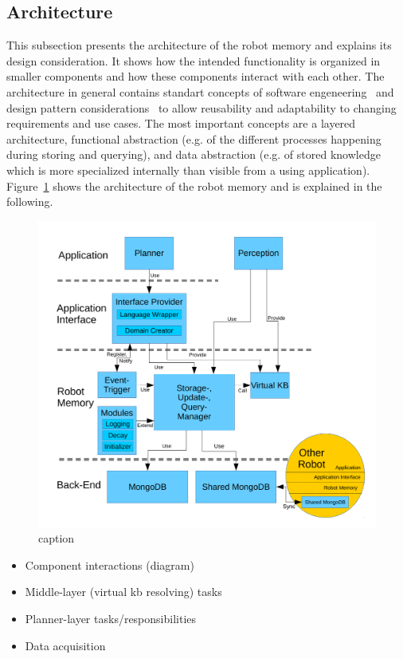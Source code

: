 \documentclass[a4paper,11pt]{article}
\newcommand{\reffig}[1]{Figure~\ref{#1}}
\begin{document}
\subsection{Architecture}
\label{sec:arch}
This subsection presents the architecture of the robot memory and
explains its design consideration. It shows how the intended
functionality is organized in smaller components and how these
components interact with each other.  The architecture in general
contains standart concepts of software
engeneering~\cite{software-architecture} and design pattern
considerations~\cite{design-patterns} to allow reusability and
adaptability to changing requirements and use cases. The most
important concepts are a layered architecture, functional abstraction
(e.g. of the different processes happening during storing and
querying), and data abstraction (e.g. of stored knowledge which is
more specialized internally than visible from a using
application). \reffig{fig:arch} shows the architecture of the robot
memory and is explained in the following.


\begin{figure}
  \centering
  \includegraphics[width=1\textwidth]{architecture.pdf}
  \caption{caption}
  \label{fig:arch}
\end{figure}


\begin{itemize}
\item Component interactions (diagram)
\item Middle-layer (virtual kb resolving) tasks
\item Planner-layer tasks/responsibilities
\item Data acquisition
\end{itemize}
\end{document}
